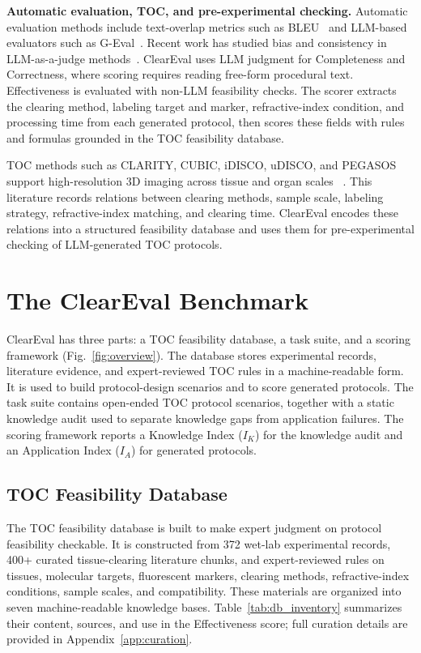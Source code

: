 \documentclass[conference]{IEEEtran}
\begin{document}
\noindent\textbf{Automatic evaluation, TOC, and pre-experimental checking.}
Automatic evaluation methods include text-overlap metrics such as
BLEU~\cite{papineni2002bleu} and LLM-based evaluators such as
G-Eval~\cite{liu2023geval}. Recent work has studied bias and consistency in
LLM-as-a-judge methods~\cite{li2024survey,zheng2023judging}. ClearEval uses
LLM judgment for Completeness and Correctness, where scoring requires reading
free-form procedural text. Effectiveness is evaluated with non-LLM feasibility
checks. The scorer extracts the clearing method, labeling target and marker,
refractive-index condition, and processing time from each generated protocol,
then scores these fields with rules and formulas grounded in the TOC feasibility
database.

TOC methods such as CLARITY, CUBIC, iDISCO, uDISCO, and PEGASOS support
high-resolution 3D imaging across tissue and organ scales
~\cite{chung2013clarity,ueda2020tissue,wang2025advances,
richardson2025unlocking,mai2024tissue}. This literature records relations
between clearing methods, sample scale, labeling strategy, refractive-index
matching, and clearing time. ClearEval encodes these relations into a
structured feasibility database and uses them for pre-experimental checking of
LLM-generated TOC protocols.

\section{The ClearEval Benchmark}\label{sec:benchmark}

ClearEval has three parts: a TOC feasibility database, a task suite, and a
scoring framework (Fig.~\ref{fig:overview}). The database stores experimental
records, literature evidence, and expert-reviewed TOC rules in a machine-readable
form. It is used to build protocol-design scenarios and to score generated
protocols. The task suite contains open-ended TOC protocol scenarios, together
with a static knowledge audit used to separate knowledge gaps from application
failures. The scoring framework reports a Knowledge Index ($I_K$) for the
knowledge audit and an Application Index ($I_A$) for generated protocols.

\subsection{TOC Feasibility Database}

The TOC feasibility database is built to make expert judgment on protocol
feasibility checkable. It is constructed from 372 wet-lab experimental records,
400+ curated tissue-clearing literature chunks, and expert-reviewed rules on
tissues, molecular targets, fluorescent markers, clearing methods,
refractive-index conditions, sample scales, and compatibility. These materials
are organized into seven machine-readable knowledge bases. Table~\ref{tab:db_inventory}
summarizes their content, sources, and use in the Effectiveness score; full
curation details are provided in Appendix~\ref{app:curation}.
\end{document}
